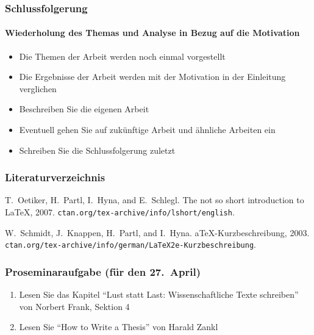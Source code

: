 \begin{frame}
\frametitle{Schlussfolgerung}
\framesubtitle{Wiederholung des Themas und Analyse in Bezug auf die Motivation}

\begin{itemize}
\item<2-> Die Themen der Arbeit werden noch einmal vorgestellt
\item<3-> Die Ergebnisse der Arbeit werden mit der Motivation in der Einleitung
  verglichen
\item<4-> Beschreiben Sie die eigenen Arbeit
\item<5-> Eventuell gehen Sie auf zukünftige Arbeit und ähnliche Arbeiten ein
\item<6-> Schreiben Sie die Schlussfolgerung zuletzt
\end{itemize}

\bigskip
\begin{Beispiel}
\end{Beispiel}
\end{frame}

\begin{frame}
\frametitle{Literaturverzeichnis}
\small
% 
% 
\begin{thebibliography}{1}

T.~Oetiker, H.~Partl, I.~Hyna, and E.~Schlegl.
\newblock The not so short introduction to {L}a{T}e{X}, 2007.
\newblock \texttt{ctan.org/tex-archive/info/lshort/english}.

W.~Schmidt, J.~Knappen, H.~Partl, and I.~Hyna.
a{T}e{X}-{K}urzbeschreibung, 2003.
\newblock \texttt{ctan.org/tex-archive/info/german/LaTeX2e-Kurzbeschreibung}.

\end{thebibliography}

\end{frame}

\begin{frame}
\frametitle{Proseminaraufgabe (für den 27.~April)}    

\begin{enumerate}
\item Lesen Sie das Kapitel \enquote{Lust statt Last: Wissenschaftliche Texte schreiben}
von Norbert Frank, Sektion 4
\item Lesen Sie \enquote{How to Write a Thesis} von Harald Zankl
\end{enumerate}
\end{frame}

